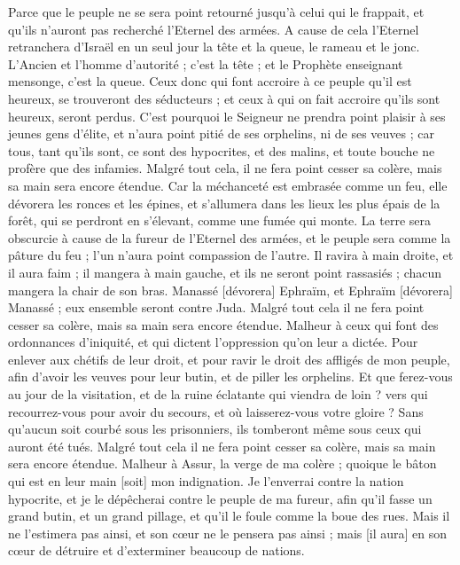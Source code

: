 \begin{multicols}{2}
Parce que le peuple ne se sera point retourné jusqu'à celui qui le frappait, et qu'ils n'auront pas recherché l'Eternel des armées.
A cause de cela l'Eternel retranchera d'Israël en un seul jour la tête et la queue, le rameau et le jonc.
L'Ancien et l'homme d'autorité ; c'est la tête ; et le Prophète enseignant mensonge, c'est la queue.
Ceux donc qui font accroire à ce peuple qu'il est heureux, se trouveront des séducteurs ; et ceux à qui on fait accroire qu'ils sont heureux, seront perdus.
C'est pourquoi le Seigneur ne prendra point plaisir à ses jeunes gens d'élite, et n'aura point pitié de ses orphelins, ni de ses veuves ; car tous, tant qu'ils sont, ce sont des hypocrites, et des malins, et toute bouche ne profère que des infamies. Malgré tout cela, il ne fera point cesser sa colère, mais sa main sera encore étendue.
Car la méchanceté est embrasée comme un feu, elle dévorera les ronces et les épines, et s'allumera dans les lieux les plus épais de la forêt, qui se perdront en s'élevant, comme une fumée qui monte.
La terre sera obscurcie à cause de la fureur de l'Eternel des armées, et le peuple sera comme la pâture du feu ; l'un n'aura point compassion de l'autre.
Il ravira à main droite, et il aura faim ; il mangera à main gauche, et ils ne seront point rassasiés ; chacun mangera la chair de son bras.
Manassé [dévorera] Ephraïm, et Ephraïm [dévorera] Manassé ; eux ensemble seront contre Juda. Malgré tout cela il ne fera point cesser sa colère, mais sa main sera encore étendue.
\VerseOne{}Malheur à ceux qui font des ordonnances d'iniquité, et qui dictent l'oppression qu'on leur a dictée.
Pour enlever aux chétifs de leur droit, et pour ravir le droit des affligés de mon peuple, afin d'avoir les veuves pour leur butin, et de piller les orphelins.
Et que ferez-vous au jour de la visitation, et de la ruine éclatante qui viendra de loin ? vers qui recourrez-vous pour avoir du secours, et où laisserez-vous votre gloire ?
Sans qu'aucun soit courbé sous les prisonniers, ils tomberont même sous ceux qui auront été tués. Malgré tout cela il ne fera point cesser sa colère, mais sa main sera encore étendue.
Malheur à Assur, la verge de ma colère ; quoique le bâton qui est en leur main [soit] mon indignation.
Je l'enverrai contre la nation hypocrite, et je le dépêcherai contre le peuple de ma fureur, afin qu'il fasse un grand butin, et un grand pillage, et qu'il le foule comme la boue des rues.
Mais il ne l'estimera pas ainsi, et son cœur ne le pensera pas ainsi ; mais [il aura] en son cœur de détruire et d'exterminer beaucoup de nations.

\end{multicols}
